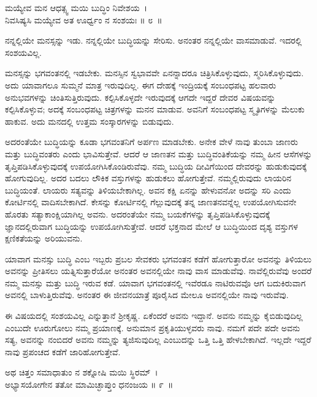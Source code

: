 \begin{shloka}
ಮಯ್ಯೇವ ಮನ ಆಧತ್ಸ್ವ ಮಯಿ ಬುದ್ಧಿಂ ನಿವೇಶಯ~।\\ನಿವಸಿಷ್ಯಸಿ ಮಯ್ಯೇವ ಅತ ಊರ್ಧ್ವಂ ನ ಸಂಶಯಃ \hfill॥ ೮~॥
\end{shloka}

\begin{artha}
ನನ್ನಲ್ಲಿಯೇ ಮನಸ್ಸನ್ನು ಇಡು. ನನ್ನಲ್ಲಿಯೇ ಬುದ್ಧಿಯನ್ನು ಸೇರಿಸು. ಅನಂತರ ನನ್ನಲ್ಲಿಯೇ ವಾಸಮಾಡುವೆ. ಇದರಲ್ಲಿ ಸಂಶಯವಿಲ್ಲ.
\end{artha}

ಮನಸ್ಸನ್ನು ಭಗವಂತನಲ್ಲಿ ಇಡಬೇಕು. ಮನಸ್ಸಿನ ಸ್ವಭಾವವೇ ಏನನ್ನಾದರೂ ಚಿತ್ರಿಸಿಕೊಳ್ಳುವುದು, ಸ್ಮರಿಸಿಕೊಳ್ಳುವುದು. ಅದು ಯಾವಾಗಲೂ ಸುಮ್ಮನೆ ಮಾತ್ರ ಇರುವುದಿಲ್ಲ. ಈಗ ದೇಹಕ್ಕೆ ಇಂದ್ರಿಯಕ್ಕೆ ಸಂಬಂಧಪಟ್ಟ ಹಲವಾರು ಅನುಭವಗಳನ್ನು ಚಿಂತಿಸುತ್ತಿರುವುದು. ಕಲ್ಪಿಸಿಕೊಳ್ಳದೇ ಇರುವುದಕ್ಕೆ ಆಗದೇ ಇದ್ದರೆ ದೇವರ ವಿಷಯವನ್ನು ಕಲ್ಪಿಸಿಕೊಳ್ಳುವ; ಅದಕ್ಕೆ ಸಂಬಂಧಪಟ್ಟ ಚಿತ್ರಗಳನ್ನು ಮನನ ಮಾಡುವ. ಅವನಿಗೆ ಸಂಬಂಧಪಟ್ಟ ಸ್ಮೃತಿಗಳನ್ನು ಮೆಲುಕು ಹಾಕುವ. ಅದು ಮನದಲ್ಲಿ ಉತ್ತಮ ಸಂಸ್ಕಾರಗಳನ್ನು ಬಿಡುವುದು.

ಅದರಂತೆಯೇ ಬುದ್ಧಿಯನ್ನು ಕೂಡಾ ಭಗವಂತನಿಗೆ ಅರ್ಪಣ ಮಾಡಬೇಕು. ಅನೇಕ ವೇಳೆ ನಾವು ತುಂಬಾ ಜಾಣರು ಮತ್ತು ಬುದ್ಧಿವಂತರು ಎಂದು ಭಾವಿಸುತ್ತೇವೆ. ಆದರೆ ಆ ಜಾಣತನ ಮತ್ತು ಬುದ್ಧಿವಂತಿಕೆಯನ್ನು ನಮ್ಮ ಹೀನ ಆಸೆಗಳನ್ನು ತೃಪ್ತಿಪಡಿಸಿಕೊಳ್ಳುವುದಕ್ಕೆ ಉಪಯೋಗಿಸಿ\-ಕೊಂಡಿರುವೆವು. ನಮ್ಮ ಬುದ್ಧಿಯ ದೀವಿಗೆಯಿಂದ ದೇವರನ್ನು ಹುಡುಕುವುದಕ್ಕೆ ಹೋಗುವುದಿಲ್ಲ. ಅದರ ಬದಲು ಲೌಕಿಕ ವಸ್ತುಗಳನ್ನು ಹುಡುಕಲು ಹೋಗುತ್ತೇವೆ. ನಮ್ಮಲ್ಲಿರುವುದು ಲಾಯರಿನ ಬುದ್ಧಿಯಂತೆ. ಲಾಯರು ಸತ್ಯವನ್ನು ತಿಳಿಯಬೇಕಾಗಿಲ್ಲ. ಅವನ ಕಕ್ಷಿ ಏನನ್ನು ಹೇಳುವನೋ ಅದನ್ನು ಸರಿ ಎಂದು ಕೋರ್ಟಿನಲ್ಲಿ ವಾದಿಸಬೇಕಾಗಿದೆ. ಕೇಸನ್ನು ಕೋರ್ಟಿನಲ್ಲಿ ಗೆಲ್ಲುವುದಕ್ಕೆ ತನ್ನ ಜಾಣತನವನ್ನೆಲ್ಲ ಉಪಯೋಗಿಸುವನೇ ಹೊರತು ಸತ್ಯಾಕಾಂಕ್ಷಿಯಾಗಿಲ್ಲ ಅವನು. ಅದರಂತೆಯೇ ನಮ್ಮ ಬಯಕೆಗಳನ್ನು ತೃಪ್ತಿಪಡಿಸಿಕೊಳ್ಳುವುದಕ್ಕೆ ಜ್ಞಾನದಲ್ಲಿರುವಾಗ ಬುದ್ಧಿಯನ್ನು ಉಪಯೋಗಿಸುತ್ತೇವೆ. ಆದರೆ ಭಕ್ತನಾದ ಮೇಲೆ ಆ ಬುದ್ಧಿಯಿಂದ ದೃಶ್ಯ ವಸ್ತುಗಳ ಕ್ಷಣಿಕತೆಯನ್ನು ಅರಿಯುವನು.

\newpage

ಯಾವಾಗ ಮನಸ್ಸು ಬುದ್ಧಿ ಎಂಬ ಇಬ್ಬರು ಪ್ರಬಲ ಸೇವಕರು ಭಗವಂತನ ಕಡೆಗೆ ಹೋಗು\-ತ್ತಾರೋ ಅವನನ್ನು ತಿಳಿಯಲು ಅವನನ್ನು ಪ್ರೀತಿಸಲು ಯತ್ನಿಸುತ್ತಾರೆಯೋ ಅನಂತರ ಅವನಲ್ಲಿಯೇ ನಾವು ವಾಸ ಮಾಡುವೆವು. ನಾವೆಲ್ಲಿರುವೆವು ಅಂದರೆ ನಮ್ಮ ಮನಸ್ಸು ಮತ್ತು ಬುದ್ಧಿ ಇರುವ ಕಡೆ. ಯಾವಾಗ ಭಗವಂತನಲ್ಲಿ ಇವೆರಡೂ ನಾಟಿರುವವೊ ಆಗ ಬದುಕಿರುವಾಗ ಅವನಲ್ಲಿ ಬಾಳುತ್ತಿರುವೆವು. ಅನಂತರ ಈ ಜೀವನಯಾತ್ರೆ ಪೂರೈಸಿದ ಮೇಲೂ ಅವನಲ್ಲಿಯೇ ನಾವು ಇರುವೆವು.

ಈ ವಿಷಯದಲ್ಲಿ ಸಂಶಯವಿಲ್ಲ ಎನ್ನುತ್ತಾನೆ ಶ‍್ರೀಕೃಷ್ಣ. ಏಕೆಂದರೆ ಅವನು ಇದ್ದಾನೆ. ಅವನು ನಮ್ಮನ್ನು ಕೈಬಿಡುವುದಿಲ್ಲ ಎಂಬುದೇ ಊರುಗೋಲು ನಮ್ಮ ಪ್ರಯಾಣಕ್ಕೆ. ಅನುಮಾನ ಪ್ರಕೃತಿಯುಳ್ಳವರು ನಾವು. ನಮಗೆ ಪದೇ ಪದೇ ಅವನು ಸತ್ಯ, ಅವನನ್ನು ನಂಬಿದರೆ ಅವನು ನಮ್ಮನ್ನು ತ್ಯಜಿಸುವುದಿಲ್ಲ ಎಂಬುದನ್ನು ಒತ್ತಿ ಒತ್ತಿ ಹೇಳಬೇಕಾಗಿದೆ. ಇಲ್ಲದೇ ಇದ್ದರೆ ನಾವು ಪ್ರಪಂಚದ ಕಡೆಗೆ ಜಾರಿಹೋಗುತ್ತೇವೆ.

\begin{shloka}
ಅಥ ಚಿತ್ತಂ ಸಮಾಧಾತುಂ ನ ಶಕ್ನೋಷಿ ಮಯಿ ಸ್ಥಿರಮ್~।\\ಅಭ್ಯಾಸಯೋಗೇನ ತತೋ ಮಾಮಿಚ್ಛಾಪ್ತುಂ ಧನಂಜಯ \hfill॥ ೯~॥
\end{shloka}

